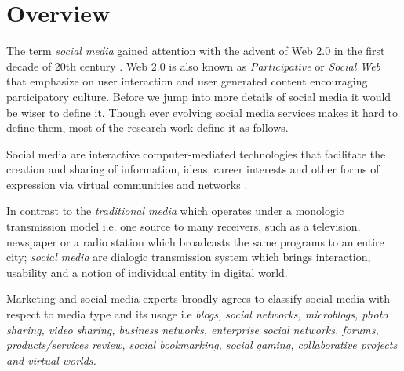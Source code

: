 \section*{Overview}
\label{sec:overview}
The term {\em social media} gained attention with the advent of Web 2.0 in the first decade of 20th century \cite{kaplan2010users}. Web 2.0 is also known as {\em Participative} or {\em Social Web} that emphasize on user interaction and user generated content encouraging participatory culture. Before we jump into more details of social media it would be wiser to define it. Though ever evolving social media services makes it hard to define them, most of the research work define it as follows.

\begin{definition}
Social media are interactive computer-mediated technologies that facilitate the creation and sharing of information, ideas, career interests and other forms of expression via virtual communities and networks \cite{kietzmann2011social}.
\end{definition}

In contrast to the {\em traditional media} which operates under a monologic transmission model i.e. one source to many receivers, such as a television, newspaper  or a radio station which broadcasts the same programs to an entire city; {\em social media} are dialogic transmission system which brings interaction, usability and a notion of individual entity in digital world.

Marketing and social media experts broadly agrees to classify social media with respect to media type and its usage i.e {\em blogs, social networks, microblogs,  photo sharing,  video sharing, business networks,  enterprise social networks, forums, products/services review, social bookmarking, social gaming, collaborative projects  and virtual worlds.}



